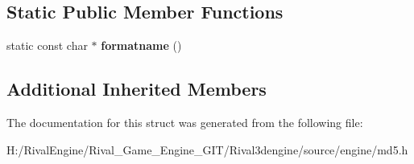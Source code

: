 \subsection*{Static Public Member Functions}
\begin{DoxyCompactItemize}
\item 
\mbox{\label{structmd5_a4accad36d614f7b906839746daa46a4c}} 
static const char $\ast$ {\bfseries formatname} ()
\end{DoxyCompactItemize}
\subsection*{Additional Inherited Members}


The documentation for this struct was generated from the following file\+:\begin{DoxyCompactItemize}
\item 
H\+:/\+Rival\+Engine/\+Rival\+\_\+\+Game\+\_\+\+Engine\+\_\+\+G\+I\+T/\+Rival3dengine/source/engine/md5.\+h\end{DoxyCompactItemize}
